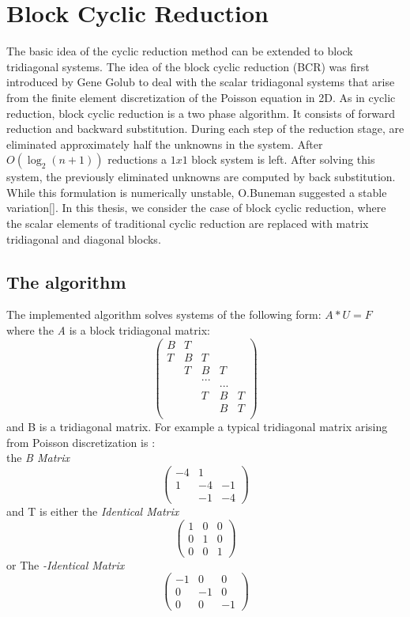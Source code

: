 \section{Block Cyclic Reduction}
The basic idea of the cyclic reduction method can be extended to block tridiagonal systems. The idea of the block cyclic reduction (BCR) was first introduced by Gene Golub to deal with the scalar tridiagonal systems that arise from the finite element discretization of the Poisson equation in 2D. As in cyclic reduction, block cyclic reduction is a two phase algorithm. It consists of forward reduction and backward substitution. During each step of the reduction stage, are eliminated approximately half the unknowns in the system. After $O(\log_2 (n+1))$ reductions a $1x1$ block system is left. After solving this system, the previously eliminated unknowns are computed by back substitution. While this formulation is numerically unstable, O.Buneman suggested a stable variation[].  In this thesis, we consider the case of block cyclic reduction, where the scalar elements of traditional cyclic reduction are replaced with matrix tridiagonal and diagonal blocks.
\subsection{The algorithm}
The implemented algorithm solves systems of the following form:
 $A*U = F$\\  
where the \emph{A} is a block tridiagonal matrix: 
\[ \left( \begin{array}{ccccc}
B  & T &     &   &\\
T  & B &  T  &    &\\
   & T &  B  & T  &\\
   &   & ...    &    &  \\     
   &   &     & ...  &  \\
   &   &  T  & B & T \\    
   &   &     & B & T\\	
    \end{array} \right)\] 
and B is a tridiagonal matrix. For example a typical tridiagonal matrix arising from 
Poisson discretization is : \\
the \emph{B Matrix}
\[ \left( \begin{array}{ccc}
-4 & 1 &  \\
1  & -4 & -1 \\
   & -1 & -4 \end{array} \right)\] 
and T is either the \emph{Identical Matrix}
\[ \left( \begin{array}{ccc}
1 & 0 & 0 \\
0 & 1 & 0 \\
0 & 0 & 1 \end{array} \right)\] or The \emph{-Identical Matrix}
\[ \left( \begin{array}{ccc}
-1 & 0 & 0 \\
0 & -1 & 0 \\
0 & 0 & -1 \end{array} \right)\] \\

